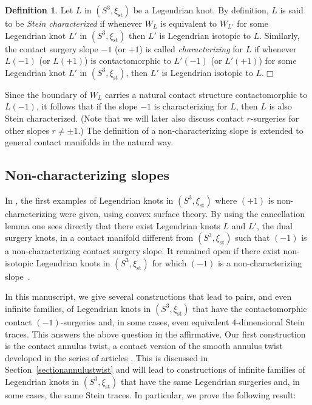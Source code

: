 \documentclass[11pt]{amsart} %
\newcommand{\xist}{\xi_{\mathrm{st}}}
\theoremstyle{plain}
\theoremstyle{definition}
\newtheorem{defi}[Theorem]{Definition}
\begin{document}
\begin{defi}
	Let $L$ in $(S^3,\xist)$ be a Legendrian knot. By definition, $L$ is said to be \textit{Stein characterized} if whenever $W_{L}$ is equivalent to $W_{L'}$ for some Legendrian knot $L'$ in $(S^3,\xist)$ then $L'$ is Legendrian isotopic to $L$. Similarly, the contact surgery slope $-1$ (or $+1$) is called \textit{characterizing} for $L$ if whenever $L(-1)$ (or $L(+1)$) is contactomorphic to $L'(-1)$ (or $L'(+1)$) for some Legendrian knot $L'$ in $(S^3,\xist)$, then $L'$ is Legendrian isotopic to $L$.\hfill$\Box$
\end{defi}

Since the boundary of $W_L$ carries a natural contact structure contactomorphic to $L(-1)$, it follows that if the slope $-1$ is characterizing for $L$, then $L$ is also Stein characterized. (Note that we will later also discuss contact $r$-surgeries for other slopes $r\not=\pm1$.) The definition of a non-characterizing slope is extended to general contact manifolds in the natural way.

\subsection{Non-characterizing slopes}
In \cite{Etnyre08}, the first examples of Legendrian knots in $(S^3,\xist)$ where $(+1)$ is non-characterizing were given, using convex surface theory. By using the cancellation lemma one sees directly that there exist Legendrian knots $L$ and $L'$, the dual surgery knots, in a contact manifold different from $(S^3,\xist)$ such that $(-1)$ is a non-characterizing contact surgery slope. It remained open if there exist non-isotopic Legendrian knots in $(S^3,\xist)$ for which $(-1)$ is a non-characterizing slope~\cite[Question~14]{Etnyre08}. 

In this manuscript, we give several constructions that lead to pairs, and even infinite families, of Legendrian knots in $(S^3,\xist)$ that have the contactomorphic contact $(-1)$-surgeries and, in some cases, even equivalent $4$-dimensional Stein traces. This answers the above question in the affirmative. Our first construction is the contact annulus twist, a contact version of the smooth annulus twist developed in the series of articles \cite{AbeJongLueckeOsoinach15, AbeJongOmaeTakeuchi13, MillerPiccirillo18, Osoinach06}. This is discussed in Section~\ref{sectionannulustwist} and will lead to constructions of infinite families of Legendrian knots in $(S^3,\xist)$ that have the same Legendrian surgeries and, in some cases, the same Stein traces. In particular, we prove the following result:
\end{document}
